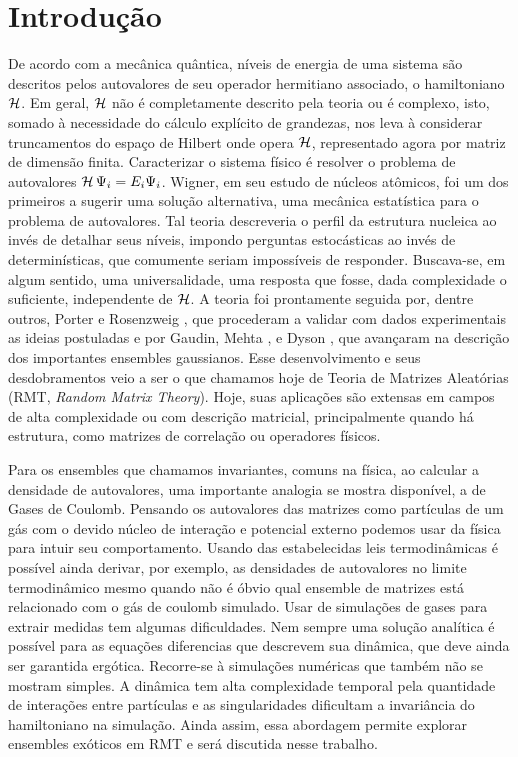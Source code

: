 \chapter{Introdução}
\label{Capitulo: Intro}

De acordo com a mecânica quântica, níveis de energia de uma sistema são descritos pelos autovalores de seu operador hermitiano associado, o hamiltoniano $\operatorname{\mathcal{H}}$. Em geral, $\operatorname{\mathcal{H}}$ não é completamente descrito pela teoria ou é complexo, isto, somado à necessidade do cálculo explícito de grandezas, nos leva à considerar truncamentos do espaço de Hilbert onde opera $\operatorname{\mathcal{H}}$, representado agora por matriz de dimensão finita. Caracterizar o sistema físico é resolver o problema de autovalores $\operatorname{\mathcal{H}} \Psi_i = E_i \Psi_i$. Wigner, em seu estudo de núcleos atômicos, foi um dos primeiros a sugerir uma solução alternativa, uma mecânica estatística para o problema de autovalores. Tal teoria descreveria o perfil da estrutura nucleica ao invés de detalhar seus níveis, impondo perguntas estocásticas ao invés de determinísticas, que comumente seriam impossíveis de responder. Buscava-se, em algum sentido, uma universalidade, uma resposta que fosse, dada complexidade o suficiente, independente de $\operatorname{\mathcal{H}}$. A teoria foi prontamente seguida por, dentre outros, Porter e Rosenzweig \cite{PoterRosen}, que procederam a validar com dados experimentais as ideias postuladas e por Gaudin, Mehta \cite{MehtaGaudin}, e Dyson \cite{Dyson}, que avançaram na descrição dos importantes ensembles gaussianos. Esse desenvolvimento e seus desdobramentos veio a ser o que chamamos hoje de Teoria de Matrizes Aleatórias (RMT, \textit{Random Matrix Theory}). Hoje, suas aplicações são extensas em campos de alta complexidade ou com descrição matricial, principalmente quando há estrutura, como matrizes de correlação ou operadores físicos.

Para os ensembles que chamamos invariantes, comuns na física, ao calcular a densidade de autovalores, uma importante analogia se mostra disponível, a de Gases de Coulomb. Pensando os autovalores das matrizes como partículas de um gás com o devido núcleo de interação e potencial externo podemos usar da física para intuir seu comportamento. Usando das estabelecidas leis termodinâmicas é possível ainda derivar, por exemplo, as densidades de autovalores no limite termodinâmico mesmo quando não é óbvio qual ensemble de matrizes está relacionado com o gás de coulomb simulado. Usar de simulações de gases para extrair medidas tem algumas dificuldades. Nem sempre uma solução analítica é possível para as equações diferencias que descrevem sua dinâmica, que deve ainda ser garantida ergótica. Recorre-se à simulações numéricas que também não se mostram simples. A dinâmica tem alta complexidade temporal pela quantidade de interações entre partículas e as singularidades dificultam a invariância do hamiltoniano na simulação. Ainda assim, essa abordagem permite explorar ensembles exóticos em RMT e será discutida nesse trabalho.


